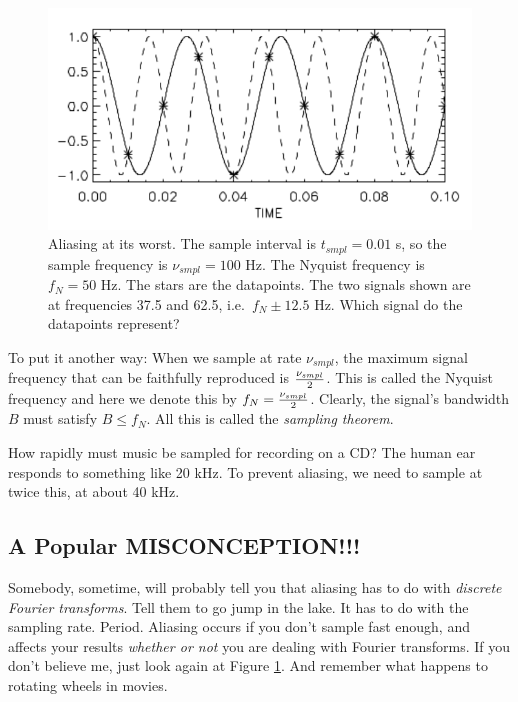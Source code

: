\documentclass[11pt,preprint]{aastex}
\begin{document}
\begin{figure}[H]
\begin{center}
\leavevmode
 \includegraphics[width=6.0in, clip=true]{fig1}
\end{center}
\label{figone}
\caption{Aliasing at its worst. The sample interval is $t_{smpl}= 0.01$
s, so the sample frequency is $\nu_{smpl} = 100$ Hz. The Nyquist
frequency is $f_N=50$ Hz. The stars are the datapoints. The two signals
shown are at frequencies 37.5 and 62.5, i.e.\ $f_N \pm 12.5$ Hz. Which
signal do the datapoints represent?  }
\end{figure}

	To put it another way: When we sample at rate $\nu_{smpl}$, the
maximum signal frequency that can be faithfully reproduced is
$\nu_{smpl} \over 2$.  This is called the Nyquist frequency and here we
denote this by $f_N = {\nu_{smpl} \over 2}$.  Clearly, the signal's
bandwidth $B$ must satisfy $B \le f_N$. All this is called the {\it
sampling theorem}.

	How rapidly must music be sampled for recording on a CD? The
human ear responds to something like 20 kHz.  To prevent aliasing, we
need to sample at twice this, at about 40 kHz. 

\subsection {A Popular MISCONCEPTION!!!}

	Somebody, sometime, will probably tell you that aliasing has to
do with {\it discrete Fourier transforms}.  Tell them to go jump in the
lake.  It has to do with the sampling rate.  Period.  Aliasing occurs if
you don't sample fast enough, and affects your results {\it whether or
not} you are dealing with Fourier transforms.  If you don't believe me,
just look again at Figure \ref{figone}. And remember what happens to rotating
wheels in movies. 
\end{document}
